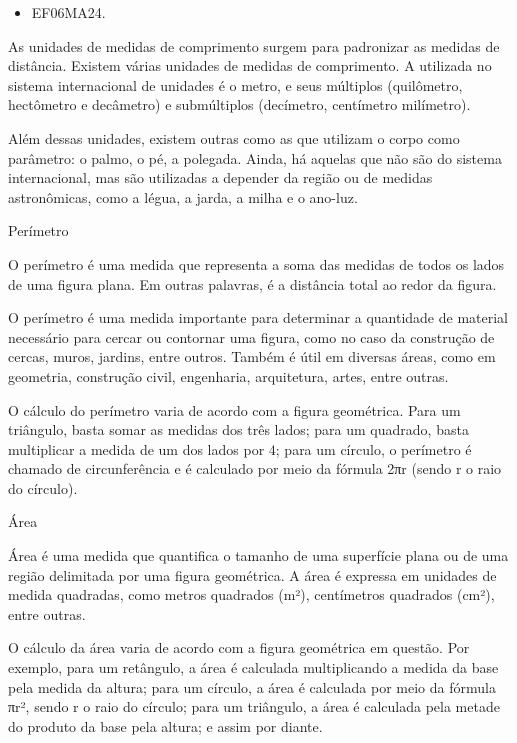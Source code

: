 
\begin{itemize}
\item EF06MA24.
\end{itemize}

As unidades de medidas de comprimento surgem para padronizar as medidas
de distância. Existem várias unidades de medidas de comprimento. A
utilizada no sistema internacional de unidades é o metro, e seus
múltiplos (quilômetro, hectômetro e decâmetro) e submúltiplos
(decímetro, centímetro milímetro).

Além dessas unidades, existem outras como as que utilizam o corpo como
parâmetro: o palmo, o pé, a polegada. Ainda, há aquelas que não são do
sistema internacional, mas são utilizadas a depender da região ou de
medidas astronômicas, como a légua, a jarda, a milha e o ano-luz.

Perímetro

O perímetro é uma medida que representa a soma das medidas de todos os
lados de uma figura plana. Em outras palavras, é a distância total ao
redor da figura.

O perímetro é uma medida importante para determinar a quantidade de
material necessário para cercar ou contornar uma figura, como no caso da
construção de cercas, muros, jardins, entre outros. Também é útil em
diversas áreas, como em geometria, construção civil, engenharia,
arquitetura, artes, entre outras.

O cálculo do perímetro varia de acordo com a figura geométrica. Para um
triângulo, basta somar as medidas dos três lados; para um quadrado,
basta multiplicar a medida de um dos lados por $4$; para um círculo, o
perímetro é chamado de circunferência e é calculado por meio da fórmula
2πr (sendo r o raio do círculo).

Área

Área é uma medida que quantifica o tamanho de uma superfície plana ou de
uma região delimitada por uma figura geométrica. A área é expressa em
unidades de medida quadradas, como metros quadrados (m²), centímetros
quadrados (cm²), entre outras.

O cálculo da área varia de acordo com a figura geométrica em questão.
Por exemplo, para um retângulo, a área é calculada multiplicando a
medida da base pela medida da altura; para um círculo, a área é
calculada por meio da fórmula πr², sendo r o raio do círculo; para um
triângulo, a área é calculada pela metade do produto da base pela
altura; e assim por diante.

